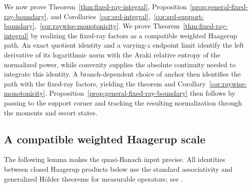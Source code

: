\documentclass[12pt]{article}
\numberwithin{equation}{section}
\theoremstyle{definition}
\theoremstyle{remark}
\newcommand{\?}{\overset{?}{=}}
\begin{document}
We now prove Theorem~\ref{thm:fixed-ray-integral}, Proposition~\ref{prop:general-fixed-ray-boundary}, and Corollaries~\ref{cor:srd-integral},~\ref{cor:srd-support-boundary},~\ref{cor:raywise-monotonicity}.  We prove Theorem~\ref{thm:fixed-ray-integral} by realizing the fixed-ray factors as a compatible weighted Haagerup path.  An exact quotient identity and a varying-$z$ endpoint limit identify the left derivative of its logarithmic norm with the Araki relative entropy of the normalized power, while convexity supplies the absolute continuity needed to integrate this identity. A branch-dependent choice of anchor then identifies the path with the fixed-ray factors, yielding the theorem and Corollary~\ref{cor:raywise-monotonicity}.  Proposition~\ref{prop:general-fixed-ray-boundary} then follows by passing to the support corner and tracking the resulting normalization through the moments and escort states.


\subsection{A compatible weighted Haagerup scale}
\label{subsec:compatible-scale}

The following lemma makes the quasi-Banach input precise. 
All identities between closed Haagerup products below use the standard
associativity and generalized H\"older theorems for measurable operators;
see \cite{Terp:1981lp,Kato:2023aro}.
\end{document}
